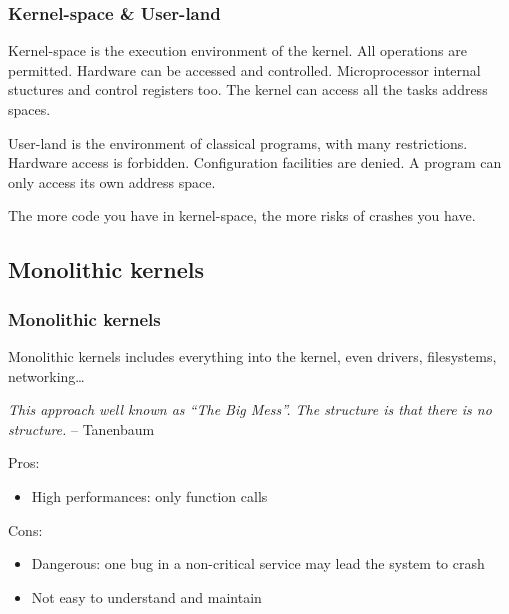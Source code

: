 \begin{frame}
  \frametitle{Kernel-space \& User-land}

  Kernel-space is the execution environment of the kernel. All
  operations are permitted. Hardware can be accessed and
  controlled. Microprocessor internal stuctures and control registers
  too. The kernel can access all the tasks address spaces.

  \-

  User-land is the environment of classical programs, with many
  restrictions. Hardware access is forbidden. Configuration facilities
  are denied. A program can only access its own address space.

  \-

  The more code you have in kernel-space, the more risks of crashes you
  have.

\end{frame}

%
%

\subsection{Monolithic kernels}

%
%

\begin{frame}
  \frametitle{Monolithic kernels}

  Monolithic kernels includes everything into the kernel, even
  drivers, filesystems, networking\ldots

  \-

  \emph{This approach well known as ``The Big Mess''. The structure is
  that there is no structure.} -- Tanenbaum

  \-

  Pros:

  \begin{itemize}
  \item
    High performances: only function calls
  \end{itemize}

  \-

  Cons:

  \begin{itemize}
  \item
    Dangerous: one bug in a non-critical service may lead the system
    to crash
  \item
    Not easy to understand and maintain
  \end{itemize}

\end{frame}

